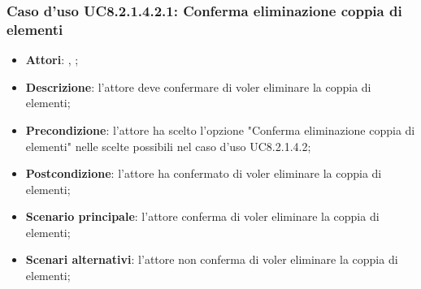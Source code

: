 		\subsubsection{Caso d'uso UC8.2.1.4.2.1: Conferma eliminazione coppia di elementi}
		\label{UC8.2.1.4.2.1}
		\begin{itemize}
			\item \textbf{Attori}: \uau, \uaupro;
			\item \textbf{Descrizione}: l'attore deve confermare di voler eliminare la coppia di elementi;
			\item \textbf{Precondizione}: l'attore ha scelto l'opzione "Conferma eliminazione coppia di elementi" nelle scelte possibili nel caso d'uso UC8.2.1.4.2;
			\item \textbf{Postcondizione}: l'attore ha confermato di voler eliminare la coppia di elementi;
			\item \textbf{Scenario principale}: l'attore conferma di voler eliminare la coppia di elementi;
			\item \textbf{Scenari alternativi}: l'attore non conferma di voler eliminare la coppia di elementi; 
		\end{itemize}
	

